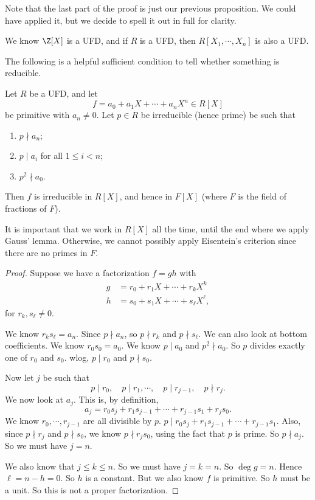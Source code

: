 \documentclass[a4paper]{article}
\begin{document}
Note that the last part of the proof is just our previous proposition. We could have applied it, but we decide to spell it out in full for clarity.

\begin{eg}
  We know $\Z[X]$ is a UFD, and if $R$ is a UFD, then $R[X_1, \cdots, X_n]$ is also a UFD.
\end{eg}

The following is a helpful sufficient condition to tell whether something is reducible.
\begin{prop}
  Let $R$ be a UFD, and let
  \[
    f = a_0 + a_1 X + \cdots + a_n X^n \in R[X]
  \]
  be primitive with $a_n \not= 0$. Let $p \in R$ be irreducible (hence prime) be such that
  \begin{enumerate}
    \item $p \nmid a_n$;
    \item $p \mid a_i$ for all $1 \leq i < n$;
    \item $p^2 \nmid a_0$.
  \end{enumerate}
  Then $f$ is irreducible in $R[X]$, and hence in $F[X]$ (where $F$ is the field of fractions of $F$).
\end{prop}
It is important that we work in $R[X]$ all the time, until the end where we apply Gauss' lemma. Otherwise, we cannot possibly apply Eisentein's criterion since there are no primes in $F$.

\begin{proof}
  Suppose we have a factorization $f = gh$ with
  \begin{align*}
    g &= r_0 + r_1 X + \cdots + r_k X^k\\
    h &= s_0 + s_1 X + \cdots + s_\ell X^\ell,
  \end{align*}
  for $r_k, s_\ell \not= 0$.

  We know $r_k s_\ell = a_n$. Since $p \nmid a_n$, so $p \nmid r_k$ and $p \nmid s_\ell$. We can also look at bottom coefficients. We know $r_0 s_0 = a_0$. We know $p \mid a_0$ and $p^2 \nmid a_0$. So $p$ divides exactly one of $r_0$ and $s_0$. wlog, $p \mid r_0$ and $p \nmid s_0$.

  Now let $j$ be such that
  \[
    p \mid r_0,\quad p \mid r_1,\cdots,\quad p \mid r_{j - 1},\quad p \nmid r_j.
  \]
  We now look at $a_j$. This is, by definition,
  \[
    a_j = r_0 s_j + r_1 s_{j - 1} + \cdots + r_{j - 1} s_1 + r_j s_0.
  \]
  We know $r_0, \cdots, r_{j - 1}$ are all divisible by $p$. $p \mid r_0 s_j + r_1 s_{j - 1} + \cdots + r_{j - 1} s_1$. Also, since $p \nmid r_j$ and $p \nmid s_0$, we know $p \nmid r_j s_0$, using the fact that $p$ is prime. So $p \nmid a_j$. So we must have $j = n$.

  We also know that $j \leq k \leq n$. So we must have $j = k = n$. So $\deg g = n$. Hence $\ell = n - h = 0$. So $h$ is a constant. But we also know $f$ is primitive. So $h$ must be a unit. So this is not a proper factorization.
\end{proof}
\end{document}
